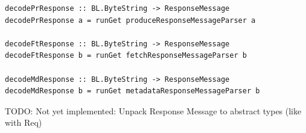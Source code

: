 \begin{lstlisting}
decodePrResponse :: BL.ByteString -> ResponseMessage
decodePrResponse a = runGet produceResponseMessageParser a

decodeFtResponse :: BL.ByteString -> ResponseMessage
decodeFtResponse b = runGet fetchResponseMessageParser b

decodeMdResponse :: BL.ByteString -> ResponseMessage
decodeMdResponse b = runGet metadataResponseMessageParser b

\end{lstlisting}

TODO: Not yet implemented: Unpack Response Message to abstract types (like with
Req)

